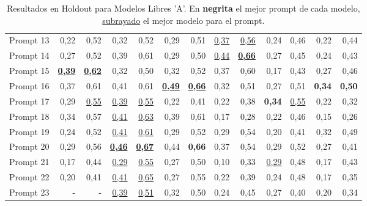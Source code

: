 \begin{table}[H]
{\begin{minipage}{\textheight}
{\begin{tabular}{l|rrrrrrrrrrrr}
Prompt 13 & 0,22 & 0,52 & 0,32 & 0,52 & 0,29 & 0,51 & \uline{0,37} & \uline{0,56} & 0,24 & 0,46 & 0,22 & 0,44 \\
Prompt 14 & 0,27 & 0,52 & 0,39 & 0,61 & 0,29 & 0,50 & \uline{0,44} & \uline{\textbf{0,66}} & 0,27 & 0,45 & 0,24 & 0,43 \\
Prompt 15 & \uline{\textbf{0,39}} & \uline{\textbf{0,62}} & 0,32 & 0,50 & 0,32 & 0,52 & 0,37 & 0,60 & 0,17 & 0,43 & 0,27 & 0,46 \\
Prompt 16 & 0,37 & 0,61 & 0,41 & 0,61 & \uline{\textbf{0,49}} & \uline{\textbf{0,66}} & 0,32 & 0,51 & 0,27 & 0,51 & \textbf{0,34} & \textbf{0,50} \\
Prompt 17 & 0,29 & \uline{0,55} & \uline{0,39} & \uline{0,55} & 0,22 & 0,41 & 0,22 & 0,38 & \textbf{0,34} & \uline{0,55} & 0,22 & 0,32 \\
Prompt 18 & 0,34 & 0,57 & \uline{0,41} & \uline{0,63} & 0,39 & 0,61 & 0,17 & 0,28 & 0,22 & 0,46 & 0,15 & 0,26 \\
Prompt 19 & 0,24 & 0,52 & \uline{0,41} & \uline{0,61} & 0,29 & 0,52 & 0,29 & 0,54 & 0,20 & 0,41 & 0,32 & 0,49 \\
Prompt 20 & 0,29 & 0,56 & \uline{\textbf{0,46}} & \uline{\textbf{0,67}} & 0,44 & \textbf{0,66} & 0,37 & 0,54 & 0,29 & 0,52 & 0,27 & 0,41 \\
Prompt 21 & 0,17 & 0,44 & \uline{0,29} & \uline{0,55} & 0,27 & 0,50 & 0,10 & 0,33 & \uline{0,29} & 0,48 & 0,17 & 0,43 \\
Prompt 22 & 0,20 & 0,41 & \uline{0,41} & \uline{0,65} & 0,27 & 0,55 & 0,22 & 0,39 & 0,24 & 0,48 & 0,17 & 0,35 \\
Prompt 23 & - & - & \uline{0,39} & \uline{0,51} & 0,32 & 0,50 & 0,24 & 0,45 & 0,27 & 0,40 & 0,20 & 0,34 \\
\hline
\end{tabular}
}%
\caption{Resultados en Holdout para Modelos Libres 'A'.  En \textbf{negrita} el mejor prompt de cada modelo, \uline{subrayado} el mejor modelo para el prompt.}
\label{tab:resultados_1}
\end{minipage}%
}
\end{table}
